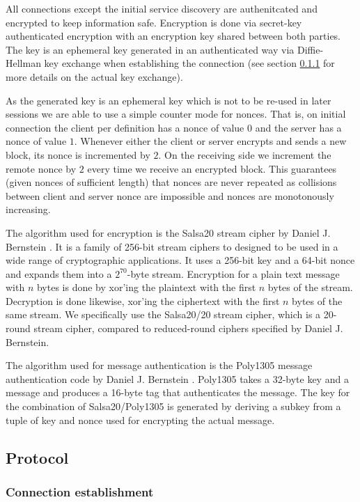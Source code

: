All connections except the initial service discovery are authenitcated and encrypted to keep information safe.
Encryption is done via secret-key authenticated encryption with an encryption key shared between both parties.
The key is an ephemeral key generated in an authenticated way via Diffie-Hellman key exchange when establishing the connection (see section \ref{sec:connection-establishment} for more details on the actual key exchange).

As the generated key is an ephemeral key which is not to be re-used in later sessions we are able to use a simple counter mode for nonces.
That is, on initial connection the client per definition has a nonce of value $0$ and the server has a nonce of value $1$.
Whenever either the client or server encrypts and sends a new block, its nonce is incremented by $2$.
On the receiving side we increment the remote nonce by $2$ every time we receive an encrypted block.
This guarantees (given nonces of sufficient length) that nonces are never repeated as collisions between client and server nonce are impossible and nonces are monotonously increasing.

The algorithm used for encryption is the Salsa20 stream cipher by Daniel J. Bernstein \cite{bernstein2008salsa}.
It is a family of 256-bit stream ciphers to designed to be used in a wide range of cryptographic applications.
It uses a 256-bit key and a 64-bit nonce and expands them into a $2^{70}$-byte stream.
Encryption for a plain text message with $n$ bytes is done by xor'ing the plaintext with the first $n$ bytes of the stream.
Decryption is done likewise, xor'ing the ciphertext with the first $n$ bytes of the same stream.
We specifically use the Salsa20/20 stream cipher, which is a 20-round stream cipher, compared to reduced-round ciphers specified by Daniel J. Bernstein.

The algorithm used for message authentication is the Poly1305 message authentication code by Daniel J. Bernstein \cite{bernstein2005poly1305}.
Poly1305 takes a 32-byte key and a message and produces a 16-byte tag that authenticates the message.
The key for the combination of Salsa20/Poly1305 is generated by deriving a subkey from a tuple of key and nonce used for encrypting the actual message.

\subsection{Protocol}

\subsubsection{Connection establishment}
\label{sec:connection-establishment}

